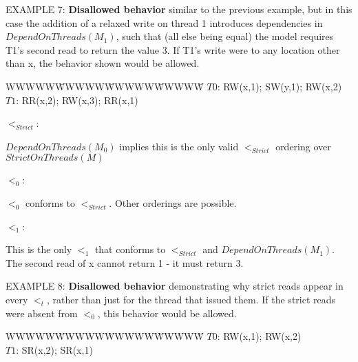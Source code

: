 \documentclass[12pt,titlepage]{article}
\newcounter{parnum}
\newcommand{\tab}{\textt{~~~~~~}}
\newcommand{\np}{
  \addtocounter{parnum}{1}
  \latex{\hspace{-2em}\makebox[2em][l]{\arabic{parnum}}}
  \html{{\bf {\arabic{parnum}}}\tab}}
\begin{document}
\bigskip
\np EXAMPLE 7: \textbf{Disallowed behavior} 
similar to the previous example, but in this case
the addition of a relaxed write on thread 1 introduces dependencies in 
$DependOnThreads(M_1)$, such that (all else being equal) the model requires T1's second read
to return the value 3. If T1's write were to any location other than x, 
the behavior shown would be allowed.
\begin{tabbing}WWWWW\=WWWWW\=WWWWW\=WWWWW\=\kill
$T0$: \> RW(x,1); \> SW(y,1); \> RW(x,2)\\
$T1$: \> RR(x,2); \> RW(x,3); \> RR(x,1)\\
\end{tabbing}

\bigskip
$<_{Strict}$:\hspace{0.1in}
\hspace{0.1in}
\parbox[t]{2.5in}
{$DependOnThreads(M_0)$ implies this is the only valid $<_{Strict}$ ordering
over $StrictOnThreads(M)$}

\bigskip
$<_0$:\hspace{0.1in}
\hspace{0.25in}
\parbox[t]{2.5in}
{$<_0$ conforms to $<_{Strict}$. Other orderings are possible.}

\bigskip
$<_1$:\hspace{0.1in}
\hspace{0.25in}
\parbox[t]{2.5in}
{This is the only $<_1$ that conforms to $<_{Strict}$ and $DependOnThreads(M_1)$.
The second read of x cannot return 1 - it must return 3.}

\bigskip
\np EXAMPLE 8: \textbf{Disallowed behavior} 
demonstrating why strict reads appear in every $<_t$,
rather than just for the thread that issued them. If the strict reads were 
absent from $<_0$, this behavior would be allowed.

\begin{tabbing}WWWWW\=WWWWW\=WWWWW\=WWWWW\=\kill
$T0$: \> RW(x,1); \> RW(x,2)\\
$T1$: \> SR(x,2); \> SR(x,1)\\
\end{tabbing}
\end{document}
